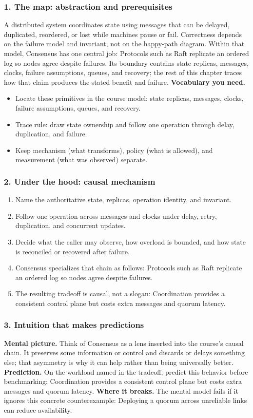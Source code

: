 \subsubsection*{1. The map: abstraction and prerequisites}
A distributed system coordinates state using messages that can be delayed, duplicated, reordered, or lost while machines pause or fail. Correctness depends on the failure model and invariant, not on the happy-path diagram.
Within that model, Consensus has one central job: Protocols such as Raft replicate an ordered log so nodes agree despite failures. Its boundary contains state replicas, messages, clocks, failure assumptions, queues, and recovery; the rest of this chapter traces how that claim produces the stated benefit and failure.
\textbf{Vocabulary you need.}\begin{itemize}
\item Locate these primitives in the course model: state replicas, messages, clocks, failure assumptions, queues, and recovery.
\item Trace rule: draw state ownership and follow one operation through delay, duplication, and failure.
\item Keep mechanism (what transforms), policy (what is allowed), and measurement (what was observed) separate.
\end{itemize}
\subsubsection*{2. Under the hood: causal mechanism}\begin{enumerate}
\item Name the authoritative state, replicas, operation identity, and invariant.
\item Follow one operation across messages and clocks under delay, retry, duplication, and concurrent updates.
\item Decide what the caller may observe, how overload is bounded, and how state is reconciled or recovered after failure.
\item Consensus specializes that chain as follows: Protocols such as Raft replicate an ordered log so nodes agree despite failures.
\item The resulting tradeoff is causal, not a slogan: Coordination provides a consistent control plane but costs extra messages and quorum latency.
\end{enumerate}
\subsubsection*{3. Intuition that makes predictions}
\textbf{Mental picture.} Think of Consensus as a lens inserted into the course's causal chain. It preserves some information or control and discards or delays something else; that asymmetry is why it can help rather than being universally better.
\textbf{Prediction.} On the workload named in the tradeoff, predict this behavior before benchmarking: Coordination provides a consistent control plane but costs extra messages and quorum latency.
\textbf{Where it breaks.} The mental model fails if it ignores this concrete counterexample: Deploying a quorum across unreliable links can reduce availability.
